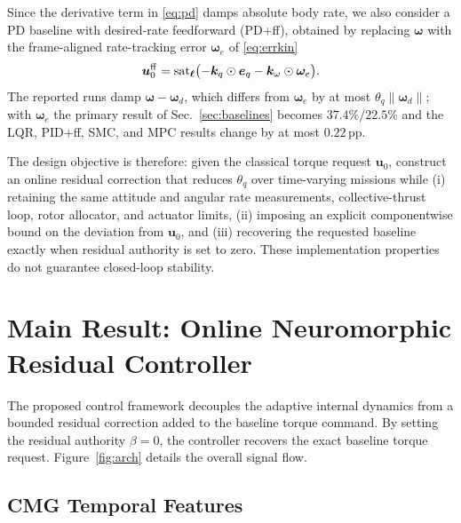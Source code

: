 \documentclass[letterpaper, 10 pt, conference]{ieeeconf}
\newcommand{\sat}{\operatorname{sat}}
\begin{document}
Since the derivative term in \eqref{eq:pd} damps absolute body rate,
we also consider a PD baseline with desired-rate feedforward (PD+ff),
obtained by replacing $\bm\omega$ with the frame-aligned rate-tracking error $\bm\omega_e$ of \eqref{eq:errkin}
\begin{equation}
 \bm u_0^{\rm ff}=\sat_{\bm\ell}\bigl(-\bm k_q\odot\bm e_q-\bm k_\omega\odot\bm\omega_e\bigr).
 \label{eq:pdff}
\end{equation}
The reported runs damp $\bm\omega-\bm\omega_d$, which differs from $\bm\omega_e$ by at most $\theta_q\|\bm\omega_d\|$; with $\bm\omega_e$ the primary result of Sec.~\ref{sec:baselines} becomes $37.4\%/22.5\%$ and the LQR, PID+ff, SMC, and MPC results change by at most $0.22$\,pp.

The design objective is therefore: given the classical torque request $\bm u_0$, construct an online residual correction that reduces $\theta_q$ over time-varying missions while (i) retaining the same attitude and angular rate measurements, collective-thrust loop, rotor allocator, and actuator limits, (ii) imposing an explicit componentwise bound on the deviation from $\bm u_0$, and (iii) recovering the requested baseline exactly when residual authority is set to zero. These implementation properties do not guarantee closed-loop stability.


\section{Main Result: Online Neuromorphic Residual Controller}
\label{sec:main}
The proposed control framework decouples the adaptive internal dynamics from a bounded residual correction added to the baseline torque command. By setting the residual authority $\beta = 0$, the controller recovers the exact baseline torque request. Figure~\ref{fig:arch} details the overall signal flow.


\subsection{CMG Temporal Features}
\end{document}
